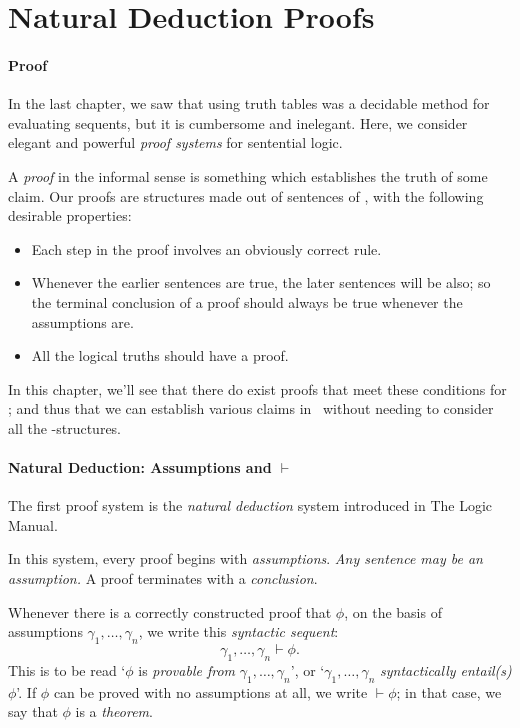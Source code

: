 
\section{Natural Deduction Proofs}
\paragraph{Proof}

In the last chapter, we saw that using truth tables was a decidable method for evaluating sequents, but it is cumbersome and inelegant. Here, we consider elegant and powerful \emph{proof systems} for sentential logic.

A \emph{proof} in the informal sense is something which establishes the truth of some claim. Our proofs are structures made out of sentences of \lone, with the following desirable properties: \begin{itemize}
	\item Each step in the proof involves an obviously correct rule.
	\item Whenever the earlier sentences are true, the later sentences will be also; so the terminal conclusion of a proof should always be true whenever the assumptions are.
	\item All the logical truths should have a proof.
\end{itemize}

In this chapter, we'll see that there do exist proofs that meet these conditions for \lone; and thus that we can establish various claims in \lone\ without needing to consider all the \lone-structures.

\paragraph{Natural Deduction: Assumptions and $\vdash$}

The first proof system is the \emph{natural deduction} system introduced in The Logic Manual. 

In this system, every proof begins with \emph{assumptions}. \emph{Any sentence may be an assumption.} A proof terminates with a \emph{conclusion}. 

 Whenever there is a correctly constructed proof that $\phi$, on the basis of assumptions $\gamma_{1},\ldots,\gamma_{n}$, we write this \emph{syntactic sequent}: {$$\gamma_{1},\ldots,\gamma_{n}\vdash\phi.$$} This is to be read `$\phi$ is \emph{provable from} $\gamma_{1},\ldots,\gamma_{n}$', or `$\gamma_{1},\ldots,\gamma_{n}$ \emph{syntactically entail(s)} $\phi$'. If $\phi$ can be proved with no assumptions at all, we write $\vdash\phi$; in that case, we say that $\phi$ is a \emph{theorem}.

